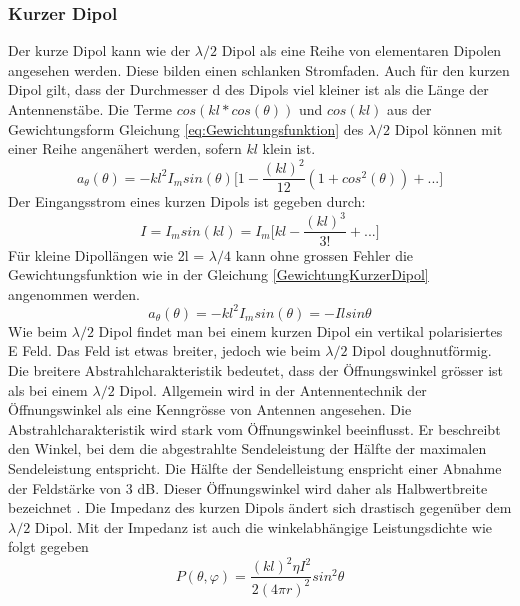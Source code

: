 \newpage
\subsubsection{Kurzer Dipol }\label{sec:kurzerDipol}
Der kurze Dipol kann wie der $\lambda /2$ Dipol als eine Reihe von elementaren Dipolen angesehen werden. Diese bilden einen schlanken Stromfaden. Auch für den kurzen Dipol gilt, dass der Durchmesser d des Dipols viel kleiner ist als die Länge der Antennenstäbe. 
Die Terme $cos(kl*cos(\theta)) $ und $cos(kl)$ aus der Gewichtungsform Gleichung \ref{eq:Gewichtungsfunktion}
 des $\lambda/2$ Dipol können mit einer Reihe angenähert werden, sofern $kl$ klein ist.
\begin{equation}
a_{\theta}(\theta)=-kl^{2}I_{m}sin(\theta) \lbrack 1- \frac{(kl)^{2}}{12}(1+cos^{2}(\theta))+...\rbrack
\end{equation}
Der Eingangsstrom eines kurzen Dipols ist gegeben durch:
\begin{equation}
I=I_{m}sin(kl)=I_{m}\lbrack kl - \frac{(kl)^{3}}{3!} +... \rbrack
\end{equation}
 Für kleine Dipollängen wie 2l = $\lambda/4 $ kann ohne grossen Fehler die Gewichtungsfunktion wie in der Gleichung \ref{GewichtungKurzerDipol}  angenommen werden.
\begin{equation}\label{GewichtungKurzerDipol}
a_{\theta}(\theta)=-kl^{2}I_{m}sin(\theta)=-Ilsin\theta
\end{equation}
Wie beim $\lambda/2$ Dipol findet man bei einem kurzen Dipol ein vertikal polarisiertes E Feld. Das Feld ist etwas breiter, jedoch wie beim $\lambda/2$ Dipol doughnutförmig. Die breitere Abstrahlcharakteristik  bedeutet, dass der Öffnungswinkel grösser ist als bei einem $\lambda/2$ Dipol. Allgemein wird in der Antennentechnik  der Öffnungswinkel als eine Kenngrösse von Antennen angesehen. Die Abstrahlcharakteristik wird stark vom Öffnungswinkel beeinflusst. Er beschreibt  den Winkel, bei dem die abgestrahlte Sendeleistung der Hälfte der maximalen Sendeleistung entspricht. Die Hälfte der Sendelleistung enspricht   einer Abnahme der Feldstärke von 3 dB. Dieser Öffnungswinkel wird  daher als Halbwertbreite bezeichnet \cite{Oeffnungswinkel}.  Die Impedanz des kurzen Dipols ändert sich  drastisch gegenüber dem $\lambda/2$ Dipol. Mit der Impedanz ist auch die winkelabhängige Leistungsdichte wie folgt gegeben\cite{elliott1981antenna}
\begin{equation}
P(\theta,\varphi)=\frac{(kl)^{2}\eta I^{2}}{2(4\pi r)^{2}}sin^{2}\theta
\end{equation}
